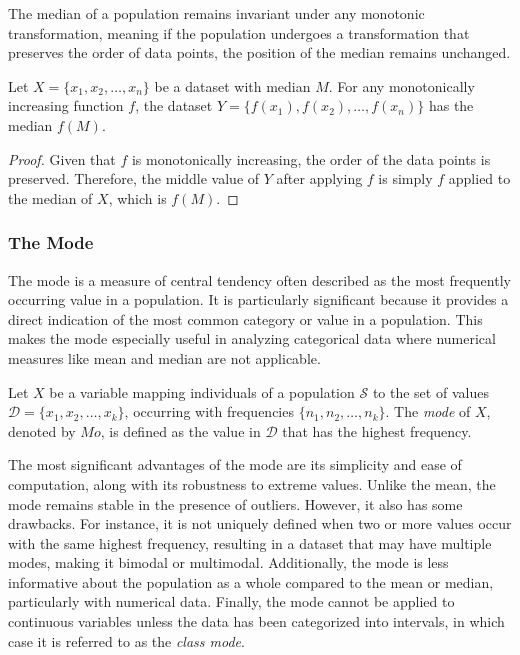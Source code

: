 The median of a population remains invariant under any monotonic transformation, meaning if the population undergoes a transformation that preserves the order of data points, the position of the median remains unchanged.

\begin{proposition}
Let \( X = \{x_1, x_2, \dots, x_n\} \) be a dataset with median \( M \). For any monotonically increasing function \( f \), the dataset \( Y = \{f(x_1), f(x_2), \dots, f(x_n)\} \) has the median \( f(M) \).
\end{proposition}
\begin{proof}
Given that \( f \) is monotonically increasing, the order of the data points is preserved. Therefore, the middle value of \( Y \) after applying \( f \) is simply \( f \) applied to the median of \( X \), which is \( f(M) \).
\end{proof}


\subsubsection*{The Mode}
\label{sec:mode}

The mode is a measure of central tendency often described as the most frequently occurring value in a population. It is particularly significant because it provides a direct indication of the most common category or value in a population. This makes the mode especially useful in analyzing categorical data where numerical measures like mean and median are not applicable.

\begin{definition}
\label{def:mode}
Let $X$ be a variable mapping individuals of a population $\mathcal{S}$ to the set of values $\mathcal{D} = \{x_1, x_2, \dots, x_k\}$, occurring with frequencies $\{n_1, n_2, \dots, n_k\}$. The \emph{mode} of $X$, denoted by $Mo$, is defined as the value in $\mathcal{D}$ that has the highest frequency.
\end{definition}

The most significant advantages of the mode are its simplicity and ease of computation, along with its robustness to extreme values. Unlike the mean, the mode remains stable in the presence of outliers. However, it also has some drawbacks. For instance, it is not uniquely defined when two or more values occur with the same highest frequency, resulting in a dataset that may have multiple modes, making it bimodal or multimodal. Additionally, the mode is less informative about the population as a whole compared to the mean or median, particularly with numerical data. Finally, the mode cannot be applied to continuous variables unless the data has been categorized into intervals, in which case it is referred to as the \emph{class mode}.

